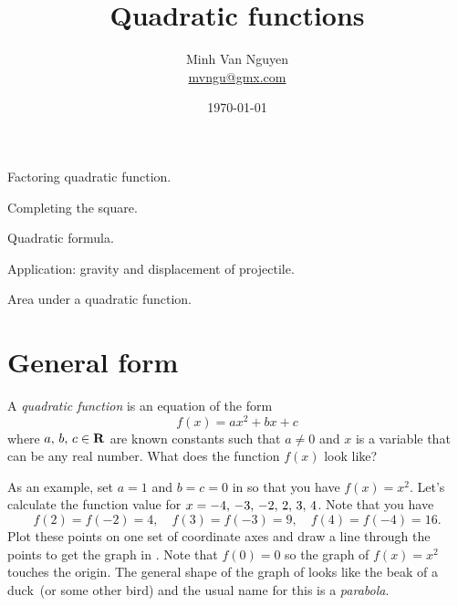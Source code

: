 \documentclass[a4paper,oneside,12pt]{article}
\begin{document}
\title{\Large\bf Quadratic functions}
\author{%
  Minh Van Nguyen \\
  \url{mvngu@gmx.com}
}
\date{\today}
\maketitle

\begin{packeditem}
\item Factoring quadratic function.

\item Completing the square.

\item Quadratic formula.

\item Application: gravity and displacement of projectile.

\item Area under a quadratic function.
\end{packeditem}



\section{General form}

A \emph{quadratic function} is an equation of the form
\begin{equation}
\label{eqn:general_quadratic_function}
f(x)
=
ax^2 + bx + c
\end{equation}
where ${a},\, {b},\, {c} \in \mathbf{R}$ are known constants such that
$a \neq 0$ and $x$ is a variable that can be any real number.  What
does the function $f(x)$ look like?

As an example, set $a = 1$ and $b = c = 0$ in
 so that you have
$f(x) = x^2$.  Let's calculate the function value for
$x = {-4},\, {-3},\, {-2},\, {2},\, {3},\, {4}$.  Note that you have
\[
f(2) = f(-2) = 4,
\quad
f(3) = f(-3) = 9,
\quad
f(4) = f(-4) = 16.
\]
Plot these points on one set of coordinate axes and draw a line
through the points to get the graph in .
Note that $f(0) = 0$ so the graph of $f(x) = x^2$ touches the origin.
The general shape of the graph of
 looks like the beak of a
duck~(or some other bird) and the usual name for this is a
\emph{parabola}.
\end{document}

